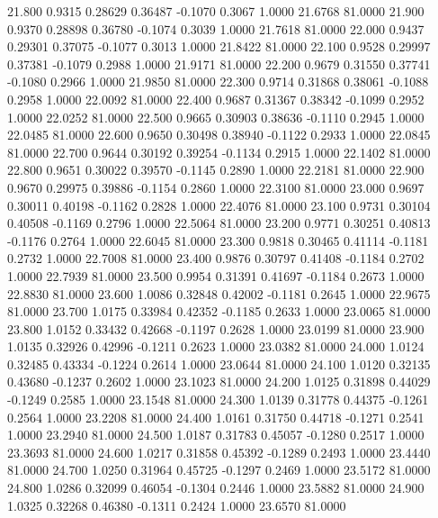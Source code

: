   21.800   0.9315   0.28629   0.36487  -0.1070   0.3067   1.0000  21.6768  81.0000
  21.900   0.9370   0.28898   0.36780  -0.1074   0.3039   1.0000  21.7618  81.0000
  22.000   0.9437   0.29301   0.37075  -0.1077   0.3013   1.0000  21.8422  81.0000
  22.100   0.9528   0.29997   0.37381  -0.1079   0.2988   1.0000  21.9171  81.0000
  22.200   0.9679   0.31550   0.37741  -0.1080   0.2966   1.0000  21.9850  81.0000
  22.300   0.9714   0.31868   0.38061  -0.1088   0.2958   1.0000  22.0092  81.0000
  22.400   0.9687   0.31367   0.38342  -0.1099   0.2952   1.0000  22.0252  81.0000
  22.500   0.9665   0.30903   0.38636  -0.1110   0.2945   1.0000  22.0485  81.0000
  22.600   0.9650   0.30498   0.38940  -0.1122   0.2933   1.0000  22.0845  81.0000
  22.700   0.9644   0.30192   0.39254  -0.1134   0.2915   1.0000  22.1402  81.0000
  22.800   0.9651   0.30022   0.39570  -0.1145   0.2890   1.0000  22.2181  81.0000
  22.900   0.9670   0.29975   0.39886  -0.1154   0.2860   1.0000  22.3100  81.0000
  23.000   0.9697   0.30011   0.40198  -0.1162   0.2828   1.0000  22.4076  81.0000
  23.100   0.9731   0.30104   0.40508  -0.1169   0.2796   1.0000  22.5064  81.0000
  23.200   0.9771   0.30251   0.40813  -0.1176   0.2764   1.0000  22.6045  81.0000
  23.300   0.9818   0.30465   0.41114  -0.1181   0.2732   1.0000  22.7008  81.0000
  23.400   0.9876   0.30797   0.41408  -0.1184   0.2702   1.0000  22.7939  81.0000
  23.500   0.9954   0.31391   0.41697  -0.1184   0.2673   1.0000  22.8830  81.0000
  23.600   1.0086   0.32848   0.42002  -0.1181   0.2645   1.0000  22.9675  81.0000
  23.700   1.0175   0.33984   0.42352  -0.1185   0.2633   1.0000  23.0065  81.0000
  23.800   1.0152   0.33432   0.42668  -0.1197   0.2628   1.0000  23.0199  81.0000
  23.900   1.0135   0.32926   0.42996  -0.1211   0.2623   1.0000  23.0382  81.0000
  24.000   1.0124   0.32485   0.43334  -0.1224   0.2614   1.0000  23.0644  81.0000
  24.100   1.0120   0.32135   0.43680  -0.1237   0.2602   1.0000  23.1023  81.0000
  24.200   1.0125   0.31898   0.44029  -0.1249   0.2585   1.0000  23.1548  81.0000
  24.300   1.0139   0.31778   0.44375  -0.1261   0.2564   1.0000  23.2208  81.0000
  24.400   1.0161   0.31750   0.44718  -0.1271   0.2541   1.0000  23.2940  81.0000
  24.500   1.0187   0.31783   0.45057  -0.1280   0.2517   1.0000  23.3693  81.0000
  24.600   1.0217   0.31858   0.45392  -0.1289   0.2493   1.0000  23.4440  81.0000
  24.700   1.0250   0.31964   0.45725  -0.1297   0.2469   1.0000  23.5172  81.0000
  24.800   1.0286   0.32099   0.46054  -0.1304   0.2446   1.0000  23.5882  81.0000
  24.900   1.0325   0.32268   0.46380  -0.1311   0.2424   1.0000  23.6570  81.0000
